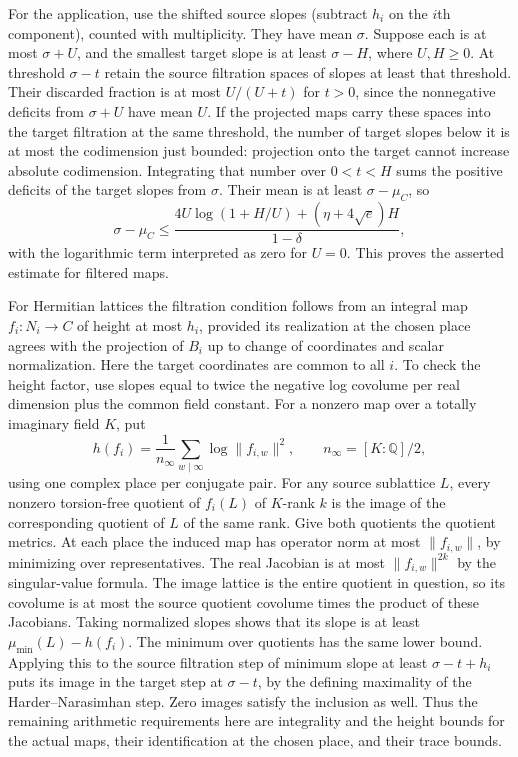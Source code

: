 \documentclass[11pt]{amsart}
\theoremstyle{definition}
\theoremstyle{remark}
\begin{document}
For the application, use the shifted source slopes (subtract $h_i$
on the $i$th component), counted with multiplicity. They have mean
$\sigma$. Suppose each is at most $\sigma+U$, and the smallest
target slope is at least $\sigma-H$, where $U,H\ge0$. At threshold
$\sigma-t$ retain the source filtration spaces of slopes at least
that threshold. Their discarded fraction is at most $U/(U+t)$
for $t>0$, since the nonnegative deficits from $\sigma+U$ have
mean $U$. If the projected maps carry these spaces into the target
filtration at the same threshold, the number of target slopes below
it is at most the codimension just bounded: projection onto the
target cannot increase absolute codimension. Integrating that
number over $0<t<H$ sums the positive deficits of the target
slopes from $\sigma$. Their mean is at least $\sigma-\mu_C$, so
\[
 \sigma-\mu_C\le
 \frac{4U\log(1+H/U)+(\eta+4\sqrt e)H}{1-\delta},
\]
with the logarithmic term interpreted as zero for $U=0$. This
proves the asserted estimate for filtered maps.

For Hermitian lattices the filtration condition follows from an
integral map $f_i:N_i\to C$ of height at most $h_i$, provided
its realization at the chosen place agrees with the projection of
$B_i$ up to change of coordinates and scalar normalization. Here
the target coordinates are common to all $i$. To check the height
factor, use slopes equal to twice the negative log covolume per
real dimension plus the common field constant. For a nonzero map
over a totally imaginary field $K$, put
\[
 h(f_i)=\frac1{n_\infty}\sum_{w\mid\infty}\log\|f_{i,w}\|^2,
 \qquad n_\infty=[K:\mathbb Q]/2 ,
\]
using one complex place per conjugate pair. For any source
sublattice $L$, every nonzero torsion-free quotient of $f_i(L)$
of $K$-rank $k$ is the image of the corresponding quotient of
$L$ of the same rank. Give both quotients the quotient metrics.
At each place the induced map has operator norm at most
$\|f_{i,w}\|$, by minimizing over representatives. The real
Jacobian is at most $\|f_{i,w}\|^{2k}$ by the singular-value
formula. The image lattice is the entire quotient in question,
so its covolume is at most the source quotient covolume times
the product of these Jacobians. Taking normalized slopes shows
that its slope is at least $\mu_{\min}(L)-h(f_i)$. The minimum
over quotients has the same lower bound. Applying this to the
source filtration step of minimum slope at least $\sigma-t+h_i$
puts its image in the target step at $\sigma-t$, by the defining
maximality of the Harder--Narasimhan step. Zero images satisfy
the inclusion as well. Thus the remaining arithmetic requirements
here are integrality and the height bounds for the actual maps,
their identification at the chosen place, and their trace bounds.
\end{document}
